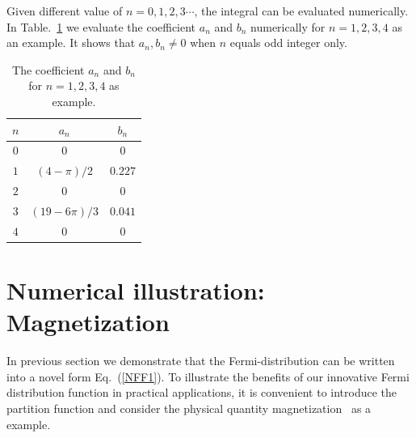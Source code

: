 \documentclass[sn-mathphys,Numbered]{sn-jnl}
\begin{document}
Given different value of $n=0,1,2,3\cdots$, the integral can be evaluated numerically. In Table.~\ref{coeff_table} we evaluate the coefficient $a_n$ and $b_n$ numerically for $n=1,2,3,4$ as an example. It shows that $a_n,b_n\neq 0$ when $n$ equals odd integer only. %
\begin{table}%
\centering
\begin{tabular}{c| c| c}
\hline\hline
$n$ &$a_n$ & $b_n$ \\
\hline
$0$ & $0$ & $0$\\ 
\hline
$1$ & $(4-\pi)/2$ & $0.227$\\
\hline
$2$ & $0$& $0$\\
\hline
 $3$ & $(19-6\pi)/3$&$0.041$\\
\hline
$4$ & $0$ & $0$\\
\hline\hline
\end{tabular}
\caption{The coefficient $a_n$ and $b_n$ for $n=1,2,3,4$ as example.}
\label{coeff_table} 
\end{table}

\section{Numerical illustration: Magnetization}
\label{NumericalResult}
In previous section we demonstrate that the Fermi-distribution can be written into a novel form Eq.~(\ref{NFF1}). To illustrate the benefits of our innovative Fermi distribution function in practical applications, it is convenient to introduce the partition function and consider the physical quantity magnetization~\cite{Melrose:2008abc} as a example.
\end{document}
